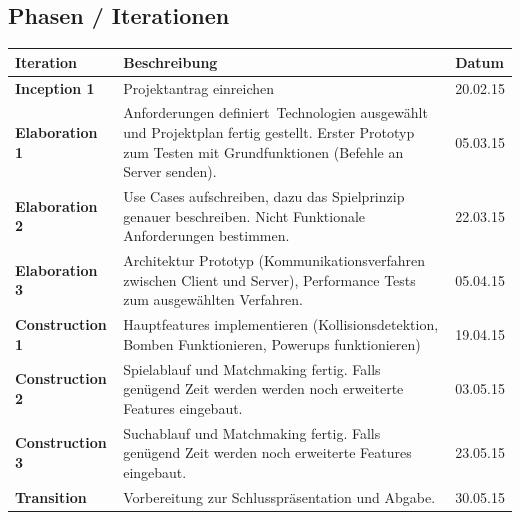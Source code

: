 \documentclass[11pt]{scrartcl}
\begin{document}
\subsection{Phasen / Iterationen}
\label{sec:Phasen / Iterationen}

\begin{table}[h]
\begin{tabularx}{\textwidth}{l X l}
\textbf{Iteration} & \textbf{Beschreibung} & \textbf{Datum} \\
\hline
\textbf{Inception 1} & Projektantrag einreichen & 20.02.15 \\
\hline
\textbf{Elaboration 1} & Anforderungen definiert\, Technologien ausgewählt 
und Projektplan fertig gestellt. Erster Prototyp zum Testen mit Grundfunktionen (Befehle an Server senden). & 05.03.15 \\
\hline
\textbf{Elaboration 2} & Use Cases aufschreiben, dazu das Spielprinzip genauer beschreiben. 
Nicht Funktionale Anforderungen bestimmen. & 22.03.15 \\
\hline
\textbf{Elaboration 3} & Architektur Prototyp (Kommunikationsverfahren 
zwischen Client und Server), 
Performance Tests zum ausgewählten Verfahren. & 05.04.15 \\
\hline
\textbf{Construction 1} & Hauptfeatures implementieren
 (Kollisionsdetektion, Bomben Funktionieren, Powerups funktionieren) & 19.04.15 \\
\hline
\textbf{Construction 2} & Spielablauf und Matchmaking fertig. 
Falls genügend Zeit werden werden noch erweiterte Features eingebaut. & 03.05.15 \\
\hline
\textbf{Construction 3} & Suchablauf und Matchmaking fertig. Falls genügend Zeit werden
 noch erweiterte Features eingebaut. & 23.05.15 \\
\hline
\textbf{Transition} & Vorbereitung zur Schlusspräsentation 
und Abgabe. & 30.05.15 \\
\hline
\end{tabularx}
\end{table}
\end{document}
